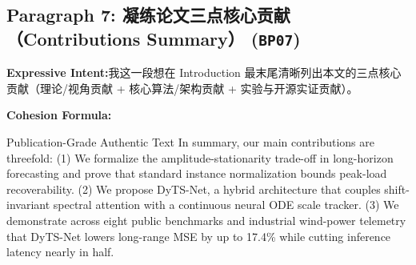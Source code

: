 \subsection*{Paragraph 7: 凝练论文三点核心贡献（Contributions Summary） (\texttt{BP07})}
\noindent\textbf{Expressive Intent:}\enspace 我这一段想在 Introduction 最末尾清晰列出本文的三点核心贡献（理论/视角贡献 + 核心算法/架构贡献 + 实验与开源实证贡献）。\par
\noindent\textbf{Cohesion Formula:}\par\vspace{4pt}
\begin{ExampleBox}{Publication-Grade Authentic Text}
In summary, our main contributions are threefold: (1) We formalize the amplitude-stationarity trade-off in long-horizon forecasting and prove that standard instance normalization bounds peak-load recoverability. (2) We propose DyTS-Net, a hybrid architecture that couples shift-invariant spectral attention with a continuous neural ODE scale tracker. (3) We demonstrate across eight public benchmarks and industrial wind-power telemetry that DyTS-Net lowers long-range MSE by up to 17.4\% while cutting inference latency nearly in half.
\end{ExampleBox}
